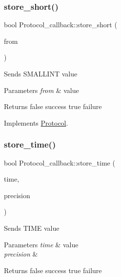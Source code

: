 \subsubsection{\texorpdfstring{store\+\_\+short()}{store\_short()}}
{\footnotesize\ttfamily bool Protocol\+\_\+callback\+::store\+\_\+short (\begin{DoxyParamCaption}\item[{longlong}]{from }\end{DoxyParamCaption})\hspace{0.3cm}{\ttfamily [virtual]}}

Sends S\+M\+A\+L\+L\+I\+NT value


\begin{DoxyParams}{Parameters}
{\em from} & value\\
\hline
\end{DoxyParams}
\begin{DoxyReturn}{Returns}
false success true failure 
\end{DoxyReturn}


Implements \mbox{\hyperlink{classProtocol}{Protocol}}.

\mbox{\label{classProtocol__callback_aa087cca583050f9985e9f7849a101eaf}} 
\subsubsection{\texorpdfstring{store\+\_\+time()}{store\_time()}}
{\footnotesize\ttfamily bool Protocol\+\_\+callback\+::store\+\_\+time (\begin{DoxyParamCaption}\item[{M\+Y\+S\+Q\+L\+\_\+\+T\+I\+ME $\ast$}]{time,  }\item[{uint}]{precision }\end{DoxyParamCaption})\hspace{0.3cm}{\ttfamily [virtual]}}

Sends T\+I\+ME value


\begin{DoxyParams}{Parameters}
{\em time} & value \\
\hline
{\em precision} & \\
\hline
\end{DoxyParams}
\begin{DoxyReturn}{Returns}
false success true failure 
\end{DoxyReturn}


